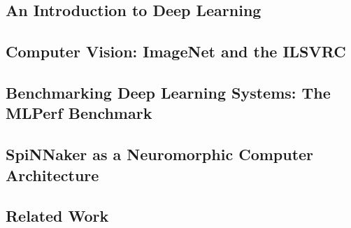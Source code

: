 \documentclass[]{article}
\begin{document}
\subsection{An Introduction to Deep Learning}






\subsection{Computer Vision: ImageNet and the ILSVRC}



\subsection{Benchmarking Deep Learning Systems: The MLPerf Benchmark}





\subsection{SpiNNaker as a Neuromorphic Computer Architecture}




\subsection{Related Work}
\end{document}
